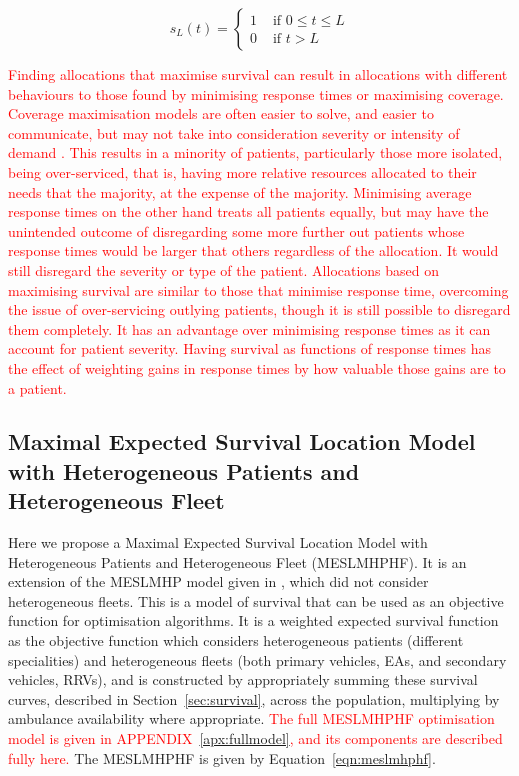 \documentclass[numbers,webpdf,imaman]{ima-authoring-template}%
\begin{document}
\begin{equation}\label{eqn:survival_cutoff}
    s_L(t) = \begin{cases}
    1 & \text{ if } 0\leq t \leq L \\
    0 & \text{ if } t > L 
    \end{cases}
\end{equation}

\textcolor{red}{Finding allocations that maximise survival can result in
allocations with different behaviours to those found by minimising response
times or maximising coverage. Coverage maximisation models are often easier to
solve, and easier to communicate, but may not take into consideration severity
or intensity of demand \citep{Erkut200842}. This results in a minority of
patients, particularly those more isolated, being over-serviced, that is, having
more relative resources allocated to their needs that the majority, at the
expense of the majority. Minimising average response times on the other hand
treats all patients equally, but may have the unintended outcome of disregarding
some more further out patients whose response times would be larger that others
regardless of the allocation. It would still disregard the severity or type of
the patient. Allocations based on maximising survival are similar to those that
minimise response time, overcoming the issue of over-servicing outlying
patients, though it is still possible to disregard them completely. It has an
advantage over minimising response times as it can account for patient severity.
Having survival as functions of response times has the effect of weighting gains
in response times by how valuable those gains are to a patient.}

\subsection{Maximal Expected Survival Location Model with Heterogeneous
            Patients and Heterogeneous Fleet}\label{sec:meslmhphf}
Here we propose a Maximal Expected Survival Location Model with Heterogeneous
Patients and Heterogeneous Fleet (MESLMHPHF). It is an extension of the
MESLMHP model given in \citet{Knight2012918}, which did not consider
heterogeneous fleets. This is a model of survival that can be used as an
objective function for optimisation algorithms. It is a weighted expected
survival function as the objective function which considers heterogeneous
patients (different specialities) and heterogeneous fleets (both primary
vehicles, EAs, and secondary vehicles, RRVs), and is constructed by
appropriately summing these survival curves, described in
Section~\ref{sec:survival}, across the population, multiplying by ambulance
availability where appropriate.
\textcolor{red}{The full MESLMHPHF optimisation model is given in
APPENDIX~\ref{apx:fullmodel}, and its components are described fully here.}
The MESLMHPHF is given by Equation~\ref{eqn:meslmhphf}.
\end{document}
